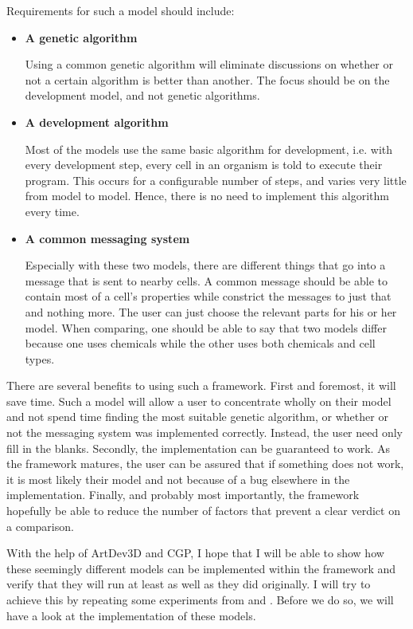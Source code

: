 Requirements for such a model should include:
\begin{itemize}
	\itemsep=0pt
	\item\textbf{A genetic algorithm}

	Using a common genetic algorithm will eliminate discussions on whether or not a certain algorithm is better than another. The focus should be on the development model, and not genetic algorithms.

	\item\textbf{A development algorithm}

	Most of the models use the same basic algorithm for development, i.e. with every development step, every cell in an organism is told to execute their program. This occurs for a configurable number of steps, and varies very little from model to model. Hence, there is no need to implement this algorithm every time.

	\item\textbf{A common messaging system}

	Especially with these two models, there are different things that go into a message that is sent to nearby cells. A common message should be able to contain most of a cell's properties while constrict the messages to just that and nothing more. The user can just choose the relevant parts for his or her model. When comparing, one should be able to say that two models differ because one uses chemicals while the other uses both chemicals and cell types.
\end{itemize}

There are several benefits to using such a framework. First and foremost, it will save time. Such a model will allow a user to concentrate wholly on their model and not spend time finding the most suitable genetic algorithm, or whether or not the messaging system was implemented correctly. Instead, the user need only fill in the blanks. Secondly, the implementation can be guaranteed to work. As the framework matures, the user can be assured that if something does not work, it is most likely their model and not because of a bug elsewhere in the implementation. Finally, and probably most importantly, the framework hopefully be able to reduce the number of factors that prevent a clear verdict on a comparison.

With the help of ArtDev3D and CGP, I hope that I will be able to show how these seemingly different models can be implemented within the framework and verify that they will run at least as well as they did originally. I will try to achieve this by repeating some experiments from \cite{hoye2006} and \cite{ecal2003}. Before we do so, we will have a look at the implementation of these models.
